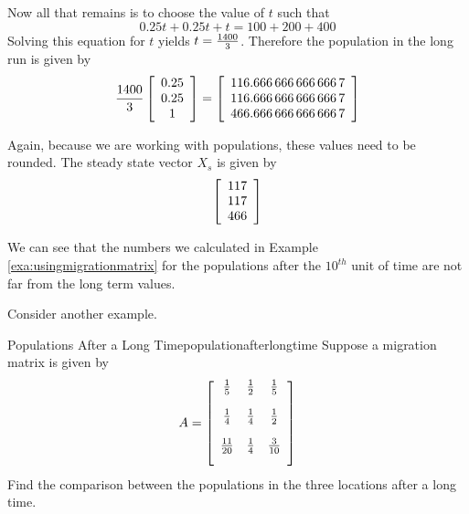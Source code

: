 \begin{solution}
Now all that remains is to choose the value of $t$ such that
\begin{equation*}
0.25t+0.25t+t=100+200+400
\end{equation*}
Solving this equation for $t$ yields $t=\vspace{.05in} \frac{1400}{3}$. Therefore the population in the long run
is given by
\begin{equation*}
\vspace{.05in} \frac{1400}{3}\leftB
\begin{array}{c}
0.25 \\
0.25 \\
1
\end{array}
\rightB = \leftB
\begin{array}{c}
116. 666\,666\,666\, 666\,7 \\
116. 666\,666\,666\, 666\,7 \\
466. 666\,666\,666\, 666\,7
\end{array}
\rightB 
\end{equation*}

Again, because we are working with populations, these values need to be rounded. The steady state vector $X_s$ is given by
\[
\left[
\begin{array}{c}
117 \\
117 \\
466
\end{array}
\right] 
\]
\end{solution}

We can see that the numbers we calculated in Example \ref{exa:usingmigrationmatrix} for the populations
after the $10^{th}$ unit of time are not far from the long term values. 

Consider another example.

\begin{example}{Populations After a Long Time}{populationafterlongtime}
Suppose a migration matrix is given by 
\begin{equation*}
A = \leftB
\begin{array}{ccc}
\vspace{.05in} \frac{1}{5} & \vspace{.05in} \frac{1}{2} & \vspace{.05in}
\frac{1}{5} \\
\vspace{.05in} \frac{1}{4} & \vspace{.05in} \frac{1}{4} & \vspace{.05in}
\frac{1}{2} \\
\vspace{.05in} \frac{11}{20} & \vspace{.05in} \frac{1}{4} & \vspace{.05in}
\frac{3}{10}
\end{array}
\rightB 
\end{equation*}
 Find the comparison between the populations in the three
locations after a long time.
\end{example}

